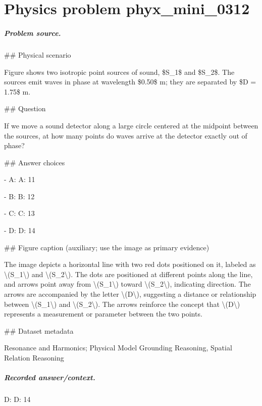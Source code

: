 
\chapter{Physics problem phyx\_mini\_0312}
\label{ch:PhyXMiniProblems_problem_phyx_mini_0312}

\paragraph{Problem source.}
\#\# Physical scenario

Figure shows two isotropic point sources of sound, \$S\_1\$ and \$S\_2\$. The sources emit waves in phase at wavelength \$0.50\$ m; they are separated by \$D = 1.75\$ m.

\#\# Question

If we move a sound detector along a large circle centered at the midpoint between the sources, at how many points do waves arrive at the detector exactly out of phase?

\#\# Answer choices

- A: A: 11

- B: B: 12

- C: C: 13

- D: D: 14

\#\# Figure caption (auxiliary; use the image as primary evidence)

The image depicts a horizontal line with two red dots positioned on it, labeled as \textbackslash{}(S\_1\textbackslash{}) and \textbackslash{}(S\_2\textbackslash{}). The dots are positioned at different points along the line, and arrows point away from \textbackslash{}(S\_1\textbackslash{}) toward \textbackslash{}(S\_2\textbackslash{}), indicating direction. The arrows are accompanied by the letter \textbackslash{}(D\textbackslash{}), suggesting a distance or relationship between \textbackslash{}(S\_1\textbackslash{}) and \textbackslash{}(S\_2\textbackslash{}). The arrows reinforce the concept that \textbackslash{}(D\textbackslash{}) represents a measurement or parameter between the two points.

\#\# Dataset metadata

Resonance and Harmonics; Physical Model Grounding Reasoning, Spatial Relation Reasoning

\paragraph{Recorded answer/context.}
D: D: 14

